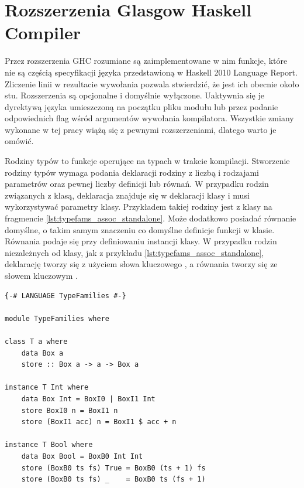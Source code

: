 {\section{Rozszerzenia Glasgow Haskell Compiler}\label{sec:rozszerzenia_ghc}

Przez rozszerzenia GHC rozumiane są zaimplementowane w nim funkcje, które nie są
częścią specyfikacji języka przedstawioną w Haskell 2010 Language
Report. Zliczenie linii w rezultacie wywołania 
pozwala stwierdzić, że jest ich obecnie około stu. Rozszerzenia są opcjonalne i
domyślnie wyłączone. Uaktywnia się je dyrektywą języka umieszczoną na początku
pliku modułu lub przez podanie odpowiednich flag wśród argumentów wywołania
kompilatora. Wszystkie zmiany wykonane w tej pracy wiążą się z pewnymi
rozszerzeniami, dlatego warto je omówić.

\label{sec:rodziny_typow}

Rodziny typów to funkcje operujące na typach w trakcie kompilacji.
Stworzenie rodziny typów wymaga podania deklaracji rodziny z liczbą i rodzajami
parametrów oraz pewnej liczby definicji lub równań. W przypadku rodzin związanych
z klasą, deklaracja znajduje się w deklaracji klasy i musi wykorzystywać parametry
klasy. Przykładem takiej rodziny jest  z klasy  na
fragmencie \ref{lst:typefams_assoc_standalone}. Może dodatkowo
posiadać równanie domyślne, o takim samym znaczeniu co domyślne definicje
funkcji w klasie. Równania podaje się przy definiowaniu instancji klasy. W
przypadku rodzin niezależnych od klasy, jak  z przykładu
\ref{lst:typefams_assoc_standalone}, deklarację tworzy się z użyciem słowa
kluczowego , a równania tworzy się ze słowem kluczowym .

\begin{lstlisting}[float,label={lst:typefams_assoc_standalone},
                   caption={Przykład pozwiązanej z klasą i niezależnej rodziny typów.}]
{-# LANGUAGE TypeFamilies #-}

module TypeFamilies where

class T a where
    data Box a
    store :: Box a -> a -> Box a

instance T Int where
    data Box Int = BoxI0 | BoxI1 Int
    store BoxI0 n = BoxI1 n
    store (BoxI1 acc) n = BoxI1 $ acc + n

instance T Bool where
    data Box Bool = BoxB0 Int Int
    store (BoxB0 ts fs) True = BoxB0 (ts + 1) fs
    store (BoxB0 ts fs) _    = BoxB0 ts (fs + 1)



\end{lstlisting}}

